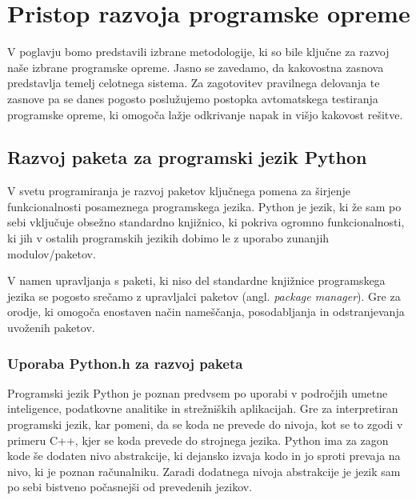 \documentclass[a4paper,12pt,openright]{book}
\begin{document}
\chapter{Pristop razvoja programske opreme}
\label{ch1}

    V poglavju bomo predstavili izbrane metodologije, ki so bile ključne za razvoj naše izbrane programske opreme. Jasno se zavedamo, da kakovostna zasnova predstavlja temelj celotnega sistema. Za zagotovitev pravilnega delovanja te zasnove pa se danes pogosto poslužujemo postopka avtomatskega testiranja programske opreme, ki omogoča lažje odkrivanje napak in višjo kakovost rešitve.

    \section{Razvoj paketa za programski jezik \newline Python}

    V svetu programiranja je razvoj paketov ključnega pomena za širjenje funkcionalnosti posameznega programskega jezika. Python je jezik, ki že sam po sebi vključuje obsežno standardno knjižnico, ki pokriva ogromno funkcionalnosti, ki jih v ostalih programskih jezikih dobimo le z uporabo zunanjih modulov/paketov.

    V namen upravljanja s paketi, ki niso del standardne knjižnice programskega jezika se pogosto srečamo z upravljalci paketov (angl. \textit{package manager}). Gre za orodje, ki omogoča enostaven način nameščanja, posodabljanja in odstranjevanja uvoženih paketov.
   
    \subsection{Uporaba Python.h za razvoj paketa}
   Programski jezik Python je poznan predvsem po uporabi v področjih umetne inteligence, podatkovne analitike in strežniških aplikacijah. Gre za interpretiran programski jezik, kar pomeni, da se koda ne prevede do nivoja, kot se to zgodi v primeru C++, kjer se koda prevede do strojnega jezika. Python ima za zagon kode še dodaten nivo abstrakcije, ki dejansko izvaja kodo in jo sproti prevaja na nivo, ki je poznan računalniku. Zaradi dodatnega nivoja abstrakcije je jezik sam po sebi bistveno počasnejši od prevedenih jezikov.
\end{document}
